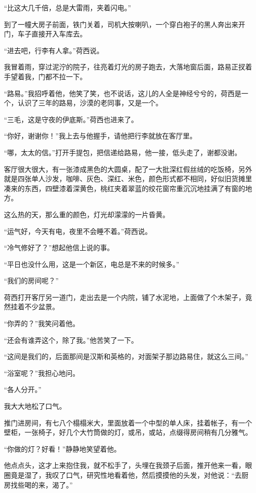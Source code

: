 \par “比这大几千倍，总是大雷雨，夹着闪电。”
\par 到了一幢大房子前面，铁门关着，司机大按喇叭，一个穿白袍子的黑人奔出来开门，车子直接开入车库去。
\par “进去吧，行李有人拿。”荷西说。
\par 我冒着雨，穿过泥泞的院子，往亮着灯光的房子跑去，大落地窗后面，路易正扠着手望着我，门都不拉一下。
\par “路易。”我招呼着他，他笑了笑，也不说话，这儿的人全是神经兮兮的，荷西是一个，认识了三年的路易，沙漠的老同事，又是一个。
\par “三毛，这是守夜的伊底斯。”荷西也进来了。
\par “你好，谢谢你！”我上去与他握手，请他把行李就放在客厅里。
\par “哪，太太的信。”打开手提包，把信递给路易，他一接，低头走了，谢都没谢。
\par 客厅很大很大，有一张漆成黑色的大圆桌，配了一大批深红假丝绒的吃饭椅，另外就是四张单人沙发，咖啡、灰色、深红、米色，颜色形式都不相同，好似旧货摊里凑来的东西，四壁漆着深黄色，桃红夹着翠蓝的绞花窗帘重沉沉地挂满了有窗的地方。
\par 这么热的天，那么重的颜色，灯光却濛濛的一片昏黄。
\par “运气好，今天有电，夜里不会睡不着。”荷西说。
\par “冷气修好了？”想起他信上说的事。
\par “平日也没什么用，这是一个新区，电总是不来的时候多。”
\par “我们的房间呢？”
\par 荷西打开客厅另一道门，走出去是一个内院，铺了水泥地，上面做了个木架子，竟然挂着不少盆景。
\par “你弄的？”我笑问着他。
\par “还会有谁弄这个，除了我。”他苦笑了一下。
\par “这间是我们的，后面那间是汉斯和英格的，对面架子那边路易住，就这么三间。”
\par “浴室呢？”我担心地问。
\par “各人分开。”
\par 我大大地松了口气。
\par 推门进房间，有七八个榻榻米大，里面放着一个中型的单人床，挂着帐子，有一个壁柜，一张椅子，好几个大竹筒做的灯，或吊，或站，点缀得房间稍有几分雅气。
\par “你做的灯？好看！”静静地笑望着他。
\par 他点点头，这才上来抱住我，就不松手了，头埋在我颈子后面，推开他来一看，眼圈竟是湿了，我叹了口气，研究性地看着他，然后摸摸他的头发，对他说：“去厨房找些喝的来，渴了。”

